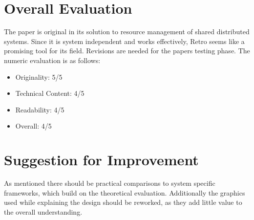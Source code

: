 \documentclass[a4paper]{article}
\begin{document}
\section{Overall Evaluation}
The paper is original in its solution to resource management of shared distributed systems. Since it is system independent and works effectively, Retro seems like a promising tool for its field. Revisions are needed for the papers testing phase. The numeric evaluation is as follows:
	\begin{itemize}
	\setlength{\itemsep}{-2pt}
	\item Originality: 5/5
	\item Technical Content: 4/5
	\item Readability: 4/5
	\item Overall: 4/5
	\end{itemize}

\section{Suggestion for Improvement}
As mentioned there should be practical comparisons to system specific frameworks, which build on the theoretical evaluation. Additionally the graphics used while explaining the design should be reworked, as they add little value to the overall understanding.
\end{document}

